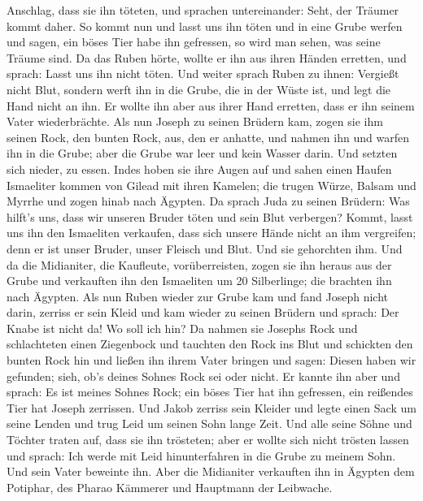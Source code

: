 Anschlag, dass sie ihn töteten,  und sprachen
untereinander: Seht, der Träumer kommt daher.  So kommt
nun und lasst uns ihn töten und in eine Grube werfen und sagen, ein
böses Tier habe ihn gefressen, so wird man sehen, was seine Träume sind.
 Da das Ruben hörte, wollte er ihn aus ihren Händen
erretten, und sprach: Lasst uns ihn nicht töten.  Und
weiter sprach Ruben zu ihnen: Vergießt nicht Blut, sondern werft ihn in
die Grube, die in der Wüste ist, und legt die Hand nicht an ihn. Er
wollte ihn aber aus ihrer Hand erretten, dass er ihn seinem Vater
wiederbrächte.  Als nun Joseph zu seinen Brüdern kam,
zogen sie ihm seinen Rock, den bunten Rock, aus, den er anhatte,
 und nahmen ihn und warfen ihn in die Grube; aber die
Grube war leer und kein Wasser darin.  Und setzten sich
nieder, zu essen. Indes hoben sie ihre Augen auf und sahen einen Haufen
Ismaeliter kommen von Gilead mit ihren Kamelen; die trugen Würze, Balsam
und Myrrhe und zogen hinab nach Ägypten.  Da sprach Juda
zu seinen Brüdern: Was hilft's uns, dass wir unseren Bruder töten und
sein Blut verbergen?  Kommt, lasst uns ihn den Ismaeliten
verkaufen, dass sich unsere Hände nicht an ihm vergreifen; denn er ist
unser Bruder, unser Fleisch und Blut. Und sie gehorchten ihm.
 Und da die Midianiter, die Kaufleute, vorüberreisten,
zogen sie ihn heraus aus der Grube und verkauften ihn den Ismaeliten um
20 Silberlinge; die brachten ihn nach Ägypten.  Als nun
Ruben wieder zur Grube kam und fand Joseph nicht darin, zerriss er sein
Kleid  und kam wieder zu seinen Brüdern und sprach: Der
Knabe ist nicht da! Wo soll ich hin?  Da nahmen sie
Josephs Rock und schlachteten einen Ziegenbock und tauchten den Rock ins
Blut  und schickten den bunten Rock hin und ließen ihn
ihrem Vater bringen und sagen: Diesen haben wir gefunden; sieh, ob's
deines Sohnes Rock sei oder nicht.  Er kannte ihn aber
und sprach: Es ist meines Sohnes Rock; ein böses Tier hat ihn gefressen,
ein reißendes Tier hat Joseph zerrissen.  Und Jakob
zerriss sein Kleider und legte einen Sack um seine Lenden und trug Leid
um seinen Sohn lange Zeit.  Und alle seine Söhne und
Töchter traten auf, dass sie ihn trösteten; aber er wollte sich nicht
trösten lassen und sprach: Ich werde mit Leid hinunterfahren in die
Grube zu meinem Sohn. Und sein Vater beweinte ihn.  Aber
die Midianiter verkauften ihn in Ägypten dem Potiphar, des Pharao
Kämmerer und Hauptmann der Leibwache.

